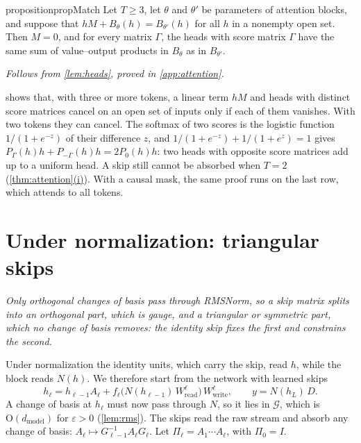 \documentclass[10pt]{article}
\theoremstyle{definition}
\theoremstyle{remark}
\newcommand{\Wread}{W_{\mathrm{read}}}
\newcommand{\Wwrite}{W_{\mathrm{write}}}
\newcommand{\dm}{d_{\mathrm{model}}}
\newcommand{\Ort}{\mathrm{O}}
\newcommand{\G}{\mathcal{G}}
\newcommand{\takeaway}[1]{\noindent\textit{#1}\par\smallskip}
\DeclareRobustCommand{\cpref}[2]{\hyperref[#1:#2]{\cref*{#1}(#2)}}
\newcommand{\followsfrom}[2]{\par\vspace{-0.4\baselineskip}\noindent\hfill{\small\itshape Follows from \cref{#1}, proved in \cref{#2}.}\par\smallskip}
\begin{document}
\begin{restatable}{proposition}{propMatch}\label{prop:match}
Let $T \ge 3$, let $\theta$ and $\theta'$ be parameters of attention blocks, and suppose that $hM + B_\theta(h) = B_{\theta'}(h)$ for all $h$ in a nonempty open set. Then $M = 0$, and for every matrix $\Gamma$, the heads with score matrix $\Gamma$ have the same sum of value--output products in $B_\theta$ as in $B_{\theta'}$.
\end{restatable}
\followsfrom{lem:heads}{app:attention}

 shows that, with three or more tokens, a linear term $hM$ and heads with distinct score matrices cancel on an open set of inputs only if each of them vanishes. With two tokens they can cancel. The softmax of two scores is the logistic function $1/(1 + e^{-z})$ of their difference $z$, and $1/(1 + e^{-z}) + 1/(1 + e^{z}) = 1$ gives $P_\Gamma(h)h + P_{-\Gamma}(h)h = 2P_0(h)h$: two heads with opposite score matrices add up to a uniform head. A skip still cannot be absorbed when $T = 2$ (\cpref{thm:attention}{i}). With a causal mask, the same proof runs on the last row, which attends to all tokens.

\section{Under normalization: triangular skips}\label{sec:norm}

\takeaway{Only orthogonal changes of basis pass through RMSNorm, so a skip matrix splits into an orthogonal part, which is gauge, and a triangular or symmetric part, which no change of basis removes: the identity skip fixes the first and constrains the second.}

Under normalization the identity units, which carry the skip, read $h$, while the block reads $N(h)$. We therefore start from the network with learned skips
\begin{equation}\label{eq:prenorm}
h_\ell = h_{\ell-1}A_\ell + f_\ell\big(N(h_{\ell-1})\,\Wread^{\ell}\big)\,\Wwrite^{\ell},\qquad y = N(h_L)\,D.
\end{equation}
A change of basis at $h_\ell$ must now pass through $N$, so it lies in $\G$, which is $\Ort(\dm)$ for $\varepsilon > 0$ (\cref{lem:rms}). The skips read the raw stream and absorb any change of basis: $A_\ell \mapsto G_{\ell-1}^{-1}A_\ell G_\ell$. Let $\Pi_\ell = A_1 \cdots A_\ell$, with $\Pi_0 = I$.
\end{document}
